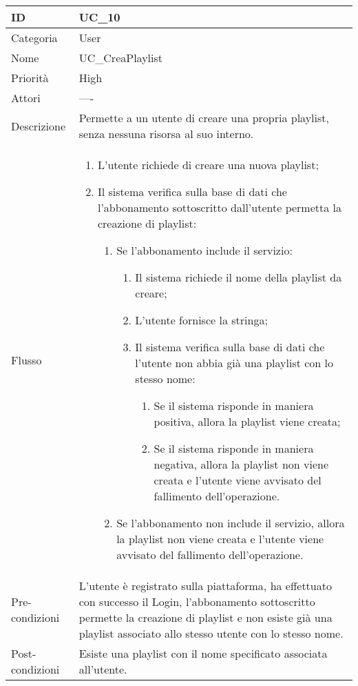 \begin{center}
\begin{tabular}{ |p{2cm}|p{13cm}|  }
\hline
ID & UC\_10 \\\hline
Categoria & User\\\hline
Nome & UC\_CreaPlaylist\\\hline
Priorità & High \\\hline
Attori &  ---- \\\hline
Descrizione & Permette a un utente di creare una propria playlist, senza nessuna risorsa al suo interno.\\\hline
Flusso &  	\begin{enumerate}
			\item L'utente richiede di creare una nuova playlist;
			\item Il sistema verifica sulla base di dati che l'abbonamento sottoscritto dall'utente permetta la creazione di playlist:
			\begin{enumerate}
				\item Se l'abbonamento include il servizio:
				\begin{enumerate}
					\item Il sistema richiede il nome della playlist da creare;
					\item L'utente fornisce la stringa;
					\item Il sistema verifica sulla base di dati che l'utente non abbia già una playlist con lo stesso nome:
					\begin{enumerate}
						\item Se il sistema risponde in maniera positiva, allora la playlist viene creata;
						\item Se il sistema risponde in maniera negativa, allora la playlist non viene creata e l'utente viene avvisato del fallimento dell'operazione.
					\end{enumerate}
				\end{enumerate}
				\item Se l'abbonamento non include il servizio, allora la playlist non viene creata e l'utente viene avvisato del fallimento dell'operazione.
			\end{enumerate}
		\end{enumerate}\\\hline
Pre-condizioni & L'utente è registrato sulla piattaforma, ha effettuato con successo il Login,  l'abbonamento sottoscritto permette la creazione di playlist e non esiste già una playlist associato allo stesso utente con lo stesso nome.\\\hline
Post-condizioni & Esiste una playlist con il nome specificato associata all'utente.\\\hline
\end{tabular}
\label{table_use_case:10}\newline


\end{center}
